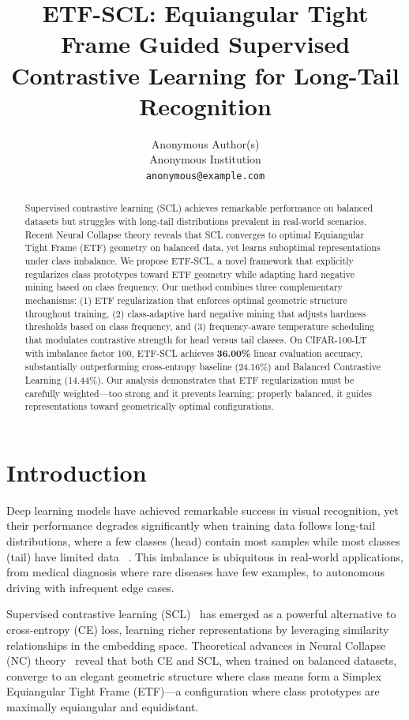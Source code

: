 \documentclass{article}
\title{ETF-SCL: Equiangular Tight Frame Guided Supervised Contrastive Learning for Long-Tail Recognition}
\author{%
  Anonymous Author(s) \\
  Anonymous Institution \\
  \texttt{anonymous@example.com}
}
\begin{document}
\maketitle

\begin{abstract}
Supervised contrastive learning (SCL) achieves remarkable performance on balanced datasets but struggles with long-tail distributions prevalent in real-world scenarios. Recent Neural Collapse theory reveals that SCL converges to optimal Equiangular Tight Frame (ETF) geometry on balanced data, yet learns suboptimal representations under class imbalance. We propose ETF-SCL, a novel framework that explicitly regularizes class prototypes toward ETF geometry while adapting hard negative mining based on class frequency. Our method combines three complementary mechanisms: (1) ETF regularization that enforces optimal geometric structure throughout training, (2) class-adaptive hard negative mining that adjusts hardness thresholds based on class frequency, and (3) frequency-aware temperature scheduling that modulates contrastive strength for head versus tail classes. On CIFAR-100-LT with imbalance factor 100, ETF-SCL achieves \textbf{36.00\%} linear evaluation accuracy, substantially outperforming cross-entropy baseline (24.16\%) and Balanced Contrastive Learning (14.44\%). Our analysis demonstrates that ETF regularization must be carefully weighted---too strong and it prevents learning; properly balanced, it guides representations toward geometrically optimal configurations.
\end{abstract}

\section{Introduction}

Deep learning models have achieved remarkable success in visual recognition, yet their performance degrades significantly when training data follows long-tail distributions, where a few classes (head) contain most samples while most classes (tail) have limited data~
\citep{wang2017learning, zhang2023deep}. This imbalance is ubiquitous in real-world applications, from medical diagnosis where rare diseases have few examples, to autonomous driving with infrequent edge cases.

Supervised contrastive learning (SCL)~
\citep{khosla2020supervised} has emerged as a powerful alternative to cross-entropy (CE) loss, learning richer representations by leveraging similarity relationships in the embedding space. Theoretical advances in Neural Collapse (NC) theory~
\citep{papyan2020prevalence} reveal that both CE and SCL, when trained on balanced datasets, converge to an elegant geometric structure where class means form a Simplex Equiangular Tight Frame (ETF)---a configuration where class prototypes are maximally equiangular and equidistant.
\end{document}

